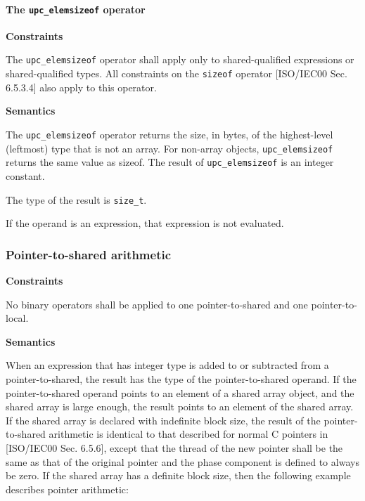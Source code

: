 \paragraph{The {\tt\bf upc\_elemsizeof} operator}

{\bf Constraints} 

\npf The {\tt upc\_elemsizeof} operator shall apply only to shared-qualified
     expressions or shared-qualified types.  All constraints on the {\tt sizeof} operator
     [ISO/IEC00 Sec. 6.5.3.4] also apply to this operator.

{\bf Semantics} 

\np The {\tt upc\_elemsizeof} operator returns the size, in bytes,
     of the highest-level (leftmost) type that is not an array. For
     non-array objects, {\tt upc\_elemsizeof} returns the same value as
     sizeof. The result of {\tt upc\_elemsizeof} is an integer constant.

\np The type of the result is {\tt size\_t}. 

\np If the operand is an expression, that expression
     is not evaluated.

\subsubsection{Pointer-to-shared arithmetic}
\label{pointer-arithmetic}
{\bf Constraints} 

\npf No binary operators shall be applied to one pointer-to-shared
    and one pointer-to-local.

{\bf Semantics} 

\np When an expression that has integer type is added to or
     subtracted from a pointer-to-shared, the result has the type of the
     pointer-to-shared operand.  If the pointer-to-shared operand points to
     an element of a shared array object, and the shared array is
     large enough, the result points to an element of the shared
     array.  If the shared array is declared with indefinite block
     size, the result of the pointer-to-shared arithmetic is identical to
     that described for normal C pointers in [ISO/IEC00 Sec. 6.5.6],
     except that the thread of the new pointer shall be the same as
     that of the original pointer and the phase component is defined to
     always be zero.  If the shared array has a definite block size,
     then the following example describes pointer arithmetic:


